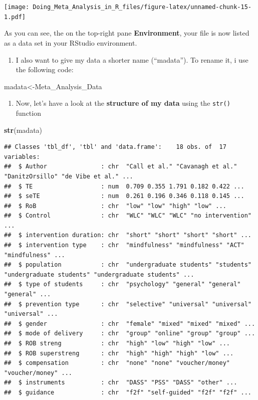 \documentclass[]{book}
\newenvironment{Shaded}{\begin{snugshade}}{\end{snugshade}}
\newcommand{\KeywordTok}[1]{\textcolor[rgb]{0.13,0.29,0.53}{\textbf{#1}}}
\newcommand{\NormalTok}[1]{#1}
\providecommand{\tightlist}{%
  \setlength{\itemsep}{0pt}\setlength{\parskip}{0pt}}
\begin{document}
\texttt{[image: Doing\_Meta\_Analysis\_in\_R\_files/figure-latex/unnamed-chunk-15-1.pdf]}

As you can see, the on the top-right pane \textbf{Environment}, your file is now listed as a data set in your RStudio environment.

\begin{enumerate}
\def\labelenumi{\arabic{enumi}.}
\setcounter{enumi}{2}
\tightlist
\item
  I also want to give my data a shorter name (``madata''). To rename it, i use the following code:
\end{enumerate}

\begin{Shaded}
\begin{Highlighting}[]
\NormalTok{madata<-Meta_Analysis_Data}
\end{Highlighting}
\end{Shaded}

\begin{enumerate}
\def\labelenumi{\arabic{enumi}.}
\setcounter{enumi}{3}
\tightlist
\item
  Now, let's have a look at the \textbf{structure of my data} using the \texttt{str()} function
\end{enumerate}

\begin{Shaded}
\begin{Highlighting}[]
\KeywordTok{str}\NormalTok{(madata)}
\end{Highlighting}
\end{Shaded}

\begin{verbatim}
## Classes 'tbl_df', 'tbl' and 'data.frame':    18 obs. of  17 variables:
##  $ Author               : chr  "Call et al." "Cavanagh et al." "DanitzOrsillo" "de Vibe et al." ...
##  $ TE                   : num  0.709 0.355 1.791 0.182 0.422 ...
##  $ seTE                 : num  0.261 0.196 0.346 0.118 0.145 ...
##  $ RoB                  : chr  "low" "low" "high" "low" ...
##  $ Control              : chr  "WLC" "WLC" "WLC" "no intervention" ...
##  $ intervention duration: chr  "short" "short" "short" "short" ...
##  $ intervention type    : chr  "mindfulness" "mindfulness" "ACT" "mindfulness" ...
##  $ population           : chr  "undergraduate students" "students" "undergraduate students" "undergraduate students" ...
##  $ type of students     : chr  "psychology" "general" "general" "general" ...
##  $ prevention type      : chr  "selective" "universal" "universal" "universal" ...
##  $ gender               : chr  "female" "mixed" "mixed" "mixed" ...
##  $ mode of delivery     : chr  "group" "online" "group" "group" ...
##  $ ROB streng           : chr  "high" "low" "high" "low" ...
##  $ ROB superstreng      : chr  "high" "high" "high" "low" ...
##  $ compensation         : chr  "none" "none" "voucher/money" "voucher/money" ...
##  $ instruments          : chr  "DASS" "PSS" "DASS" "other" ...
##  $ guidance             : chr  "f2f" "self-guided" "f2f" "f2f" ...
\end{verbatim}
\end{document}
